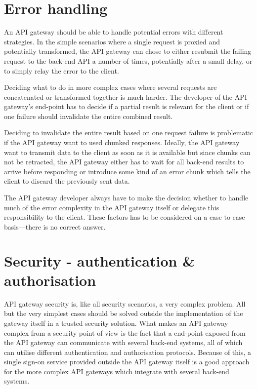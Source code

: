 \documentclass{cslthse-msc}
\begin{document}
\section{Error handling}
An API gateway should be able to handle potential errors with different strategies. In the simple scenarios where a single request is proxied and potentially transformed, the API gateway can chose to either resubmit the failing request to the back-end API a number of times, potentially after a small delay, or to simply relay the error to the client.

Deciding what to do in more complex cases where several requests are concatenated or transformed together is much harder. The developer of the API gateway's end-point has to decide if a partial result is relevant for the client or if one failure should invalidate the entire combined result.

Deciding to invalidate the entire result based on one request failure is problematic if the API gateway want to used chunked responses. Ideally, the API gateway want to transmit data to the client as soon as it is available but since chunks can not be retracted, the API gateway either has to wait for all back-end results to arrive before responding or introduce some kind of an error chunk which tells the client to discard the previously sent data.

The API gateway developer always have to make the decision whether to handle much of the error complexity in the API gateway itself or delegate this responsibility to the client. These factors has to be considered on a case to case basis---there is no correct answer.

\section{Security - authentication \& authorisation}
\label{sec:security}
API gateway security is, like all security scenarios, a very complex problem. All but the very simplest cases should be solved outside the implementation of the gateway itself in a trusted security solution. What makes an API gateway complex from a security point of view is the fact that a end-point exposed from the API gateway can communicate with several back-end systems, all of which can utilise different authentication and authorisation protocols. Because of this, a single sign-on service provided outside the API gateway itself is a good approach for the more complex API gateways which integrate with several back-end systems.
\end{document}
